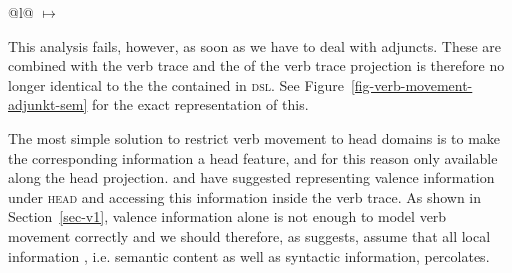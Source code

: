 \begin{exe}
\begin{xlist}
\ea
\label{kiss-dsl-lr-2}
\begin{tabular}[t]{@{}l@{}}
 $\mapsto$ \\
\end{tabular}
\z
This analysis fails, however, as soon as we have to deal with adjuncts. These are combined
with the verb trace and the \contv of the verb trace projection is therefore no longer
identical to the the \contv contained in \textsc{dsl}. See Figure~\vref{fig-verb-movement-adjunkt-sem}
for the exact representation of this.

The most simple solution to restrict verb movement to head domains is to make the corresponding
information a head feature, and for this reason only available along the head projection. \citet{Oliva92b}
and \citet{Frank94,Frank94b} have suggested representing valence information under \textsc{head} and
accessing this information inside the verb trace. As shown in Section~\ref{sec-v1}, valence information
alone is not enough to model verb movement correctly and we should therefore, as \citet{Kiss95a} suggests, 
assume that all local information , i.e. semantic content as well as syntactic information, percolates.



\end{xlist}
\end{exe}
